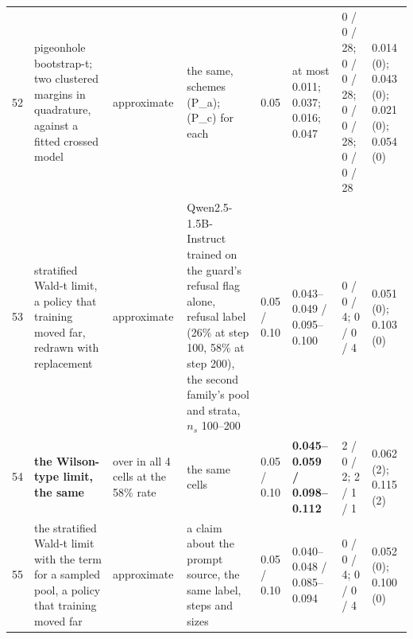 \begin{tabular}{@{}r p{2.8cm} p{2.0cm} p{3.9cm} l p{2.1cm} p{2.0cm} p{1.9cm}@{}}
52 & pigeonhole bootstrap-t; two clustered margins in quadrature, against a fitted crossed model & approximate & the same, schemes (P\_a); (P\_c) for each & 0.05 & at most 0.011; 0.037; 0.016; 0.047 & 0 / 0 / 28; 0 / 0 / 28; 0 / 0 / 28; 0 / 0 / 28 & 0.014 (0); 0.043 (0); 0.021 (0); 0.054 (0) \\
53 & stratified Wald-t limit, a policy that training moved far, redrawn with replacement & approximate & Qwen2.5-1.5B-Instruct trained on the guard's refusal flag alone, refusal label (26\% at step 100, 58\% at step 200), the second family's pool and strata, $n_s$ 100--200 & 0.05 / 0.10 & 0.043--0.049 / 0.095--0.100 & 0 / 0 / 4; 0 / 0 / 4 & 0.051 (0); 0.103 (0) \\
54 & \textbf{the Wilson-type limit, the same} & over in all 4 cells at the 58\% rate & the same cells & 0.05 / 0.10 & \textbf{0.045--0.059 / 0.098--0.112} & 2 / 0 / 2; 2 / 1 / 1 & 0.062 (2); 0.115 (2) \\
55 & the stratified Wald-t limit with the term for a sampled pool, a policy that training moved far & approximate & a claim about the prompt source, the same label, steps and sizes & 0.05 / 0.10 & 0.040--0.048 / 0.085--0.094 & 0 / 0 / 4; 0 / 0 / 4 & 0.052 (0); 0.100 (0) \\
\bottomrule
\end{tabular}
